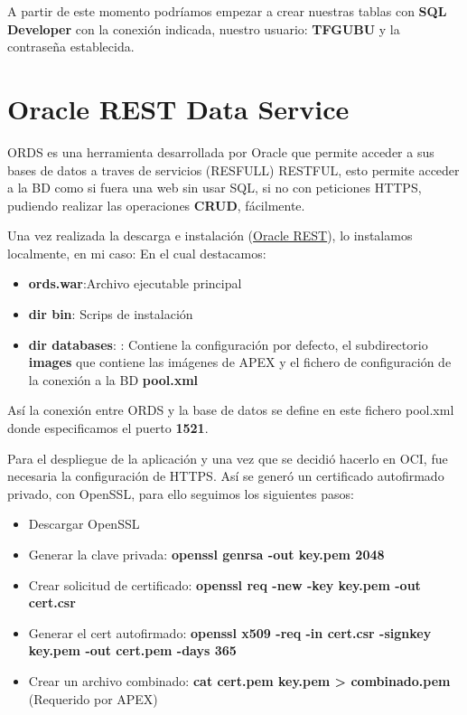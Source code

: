 A partir de este momento podríamos empezar a crear nuestras tablas con \textbf{SQL Developer} con la conexión indicada, nuestro usuario: \textbf{TFGUBU} y la contraseña establecida.

\section{Oracle REST Data Service}
\acrfull{ORDS} es una herramienta desarrollada por Oracle que permite acceder a sus bases de datos a traves de servicios (RESFULL) \gls{RESTFUL}, esto permite acceder a la BD como si fuera una web sin usar \acrshort{SQL}, si no con peticiones \acrshort{HTTPS}, pudiendo realizar las operaciones \textbf{CRUD}, fácilmente.

Una vez realizada la descarga e instalación (\href{https://www.oracle.com/database/sqldeveloper/technologies/db-actions/download/}{Oracle REST}), lo instalamos localmente, en mi caso: 
En el cual destacamos:
\begin{itemize}
	\item \textbf{ords.war}:Archivo ejecutable principal
	\item \textbf{dir bin}: Scrips de instalación
	\item \textbf{dir databases}:
		: Contiene la configuración por defecto, el subdirectorio \textbf{images} que contiene las imágenes de \acrfull{APEX} y el fichero de configuración de la conexión a la BD \textbf{pool.xml}		
\end{itemize}
Así la conexión entre ORDS y la base de datos se define en este fichero pool.xml donde especificamos el puerto \textbf{1521}.

Para el despliegue de la aplicación y una vez que se decidió hacerlo en \acrfull{OCI}, fue necesaria la configuración de \acrshort{HTTPS}. Así se generó un certificado autofirmado privado, con OpenSSL, para ello seguimos los siguientes pasos:
\begin{itemize}
	\item Descargar OpenSSL
	\item Generar la clave privada: \textbf{openssl genrsa -out key.pem 2048}
	\item Crear solicitud de certificado: \textbf{openssl req -new -key key.pem -out cert.csr}
	\item Generar el cert autofirmado: \textbf{openssl x509 -req -in cert.csr -signkey key.pem -out cert.pem -days 365
	}
	\item Crear un archivo combinado: \textbf{\textbf{cat cert.pem key.pem > combinado.pem}} (Requerido por APEX)
\end{itemize}

